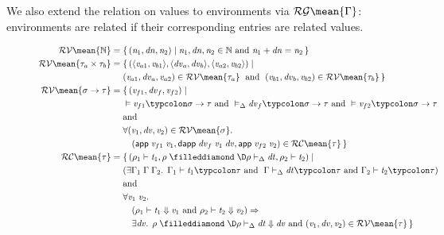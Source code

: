 We also extend the relation on values to environments via \ensuremath{\mathcal{RG}\mean{\Gamma}}: environments are related if their corresponding entries
are related values.
\begin{figure}[h!]
\begin{align*}
  \ensuremath{\mathcal{RV}\mean{\mathbb{N}}} ={}& \{ \, \ensuremath{(\Varid{n}_{1},\Varid{dn},\Varid{n}_{2})\mid\Varid{n}_{1},\Varid{dn},\Varid{n}_{2}\in \mathbb{N}\text{ and }\Varid{n}_{1}\mathbin{+}\Varid{dn}\mathrel{=}\Varid{n}_{2}}\, \}\\
  \ensuremath{\mathcal{RV}\mean{\tau_a\times\tau_b}} ={} & \{ \, \ensuremath{(\langle\Varid{v}_{a1},\Varid{v}_{b1}\rangle,\langle\Varid{dv}_a,\Varid{dv}_b\rangle,\langle\Varid{v}_{a2},\Varid{v}_{b2}\rangle)\mid\\&(\Varid{v}_{a1},\Varid{dv}_a,\Varid{v}_{a2})\in \mathcal{RV}\mean{\tau_a}\;\text{ and }\;(\Varid{v}_{b1},\Varid{dv}_b,\Varid{v}_{b2})\in \mathcal{RV}\mean{\tau_b}} \, \}\\
  \ensuremath{\mathcal{RV}\mean{\sigma\to \tau}} ={}
                  \ensuremath{&}\{ \, \ensuremath{(\Varid{v}_{f1},\Varid{dv}_f,\Varid{v}_{f2})\mid\\&\vDash\Varid{v}_{f1}\typcolon\sigma\to \tau\text{ and }\vDash_{\Delta}\Varid{dv}_f\typcolon\sigma\to \tau\text{ and }\vDash\Varid{v}_{f2}\typcolon\sigma\to \tau\\&\text{and}\\&\forall (\Varid{v}_{1},\Varid{dv},\Varid{v}_{2})\in \mathcal{RV}\mean{\sigma}\hsforall \hsdot{\circ }{\mathpunct{.}}\\&\quad(\mathsf{app}\;\Varid{v}_{f1}\;\Varid{v}_{1},\mathsf{dapp}\;\Varid{dv}_f\;\Varid{v}_{1}\;\Varid{dv},\mathsf{app}\;\Varid{v}_{f2}\;\Varid{v}_{2})\in \mathcal{RC}\mean{\tau}} \, \}\\
  \ensuremath{\mathcal{RC}\mean{\tau}} ={}&
                  \{ \, \ensuremath{(\rho_{1}\vdash\Varid{t}_{1},\rho\mathrel{\filleddiamond}\D\rho\vdash_{\Delta}\Varid{dt},\rho_{2}\vdash\Varid{t}_{2})\mid\\&(\exists \Gamma_{1}\hsforall \;\Gamma\;\Gamma_{2}\hsdot{\circ }{\mathpunct{.}}\;\Gamma_{1}\vdash\Varid{t}_{1}\typcolon\tau\text{ and }\;\Gamma\vdash_{\Delta}\Varid{dt}\typcolon\tau\text{ and }\Gamma_{2}\vdash\Varid{t}_{2}\typcolon\tau)\\&\text{and}\\&\forall \Varid{v}_{1}\hsforall \;\Varid{v}_{2}\hsdot{\circ }{\mathpunct{.}}\\&\quad(\rho_{1}\vdash\Varid{t}_{1}\Downarrow\Varid{v}_{1}\text{ and }\rho_{2}\vdash\Varid{t}_{2}\Downarrow\Varid{v}_{2})\Rightarrow\\&\quad\exists \Varid{dv}\hsforall \hsdot{\circ }{\mathpunct{.}}\;\rho\mathrel{\filleddiamond}\D\rho\vdash_{\Delta}\Varid{dt}\Downarrow\Varid{dv}\text{ and }(\Varid{v}_{1},\Varid{dv},\Varid{v}_{2})\in \mathcal{RV}\mean{\tau}} \, \}\\

\end{align*}
\end{figure}
